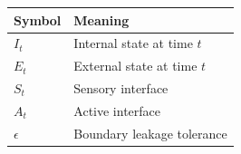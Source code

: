 
\begin{longtable}{@{}ll@{}}
\toprule
\textbf{Symbol} & \textbf{Meaning} \\
\midrule
$I_t$ & Internal state at time $t$ \\
$E_t$ & External state at time $t$ \\
$S_t$ & Sensory interface \\
$A_t$ & Active interface \\
$\epsilon$ & Boundary leakage tolerance \\
\bottomrule
\end{longtable}

